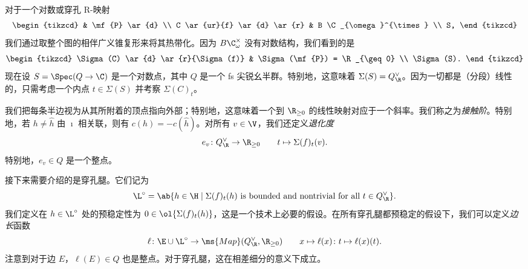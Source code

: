 \begin{exm}
\begin{center}
    \end{center}
\end{exm}

对于一个对数或穿孔 R-映射
\begin{equation*}
\begin{tikzcd}
    & \mf{P} \ar{d} \\
    C \ar{ur}{f} \ar{d} \ar{r} & B \C_{\omega}^{\times} \\
    S,
\end{tikzcd}
\end{equation*}
我们通过取整个图的相伴广义锥复形来将其热带化。因为 \(B \C_{\omega}^{\times}\) 没有对数结构，我们看到的是
\begin{equation*}
\begin{tikzcd}
    \Sigma(C) \ar{d} \ar{r}{\Sigma(f)} & \Sigma(\mf{P}) = \R_{\geq 0} \\
    \Sigma(S).
\end{tikzcd}
\end{equation*}
现在设 \(S = \Spec (Q \to \C)\) 是一个对数点，其中 \(Q\) 是一个 fs 尖锐幺半群。特别地，这意味着 \(\Sigma(S) = Q_{\R}^{\vee}\)。因为一切都是（分段）线性的，只需考虑一个内点 \(t \in \Sigma(S)\) 并考察 \(\Sigma(C)_t\)。

我们把每条半边视为从其所附着的顶点指向外部；特别地，这意味着一个到 \(\R_{\geq 0}\) 的线性映射对应于一个斜率。我们称之为\textit{接触阶}。特别地，若 \(h \neq \hat{h}\) 由 \(\imath\) 相关联，则有 \(c(h) = - c(\hat{h})\)。对所有 \(v \in \V\)，我们还定义\textit{退化度}
\[ e_v \colon Q_{\R}^{\vee} \to \R_{\geq 0} \qquad t \mapsto \Sigma(f)_t (v). \]
特别地，\(e_v \in Q\) 是一个整点。

接下来需要介绍的是穿孔腿。它们记为
\[ \L^{\circ} = \ab\{ h \in \H \mid \Sigma(f)_t(h) \text{ is bounded and nontrivial for all } t \in Q_{\R}^{\vee}\}. \] 
我们定义在 \(h \in \L^{\circ}\) 处的预稳定性为 \(0 \in \ol{\Sigma(f)_t(h)}\)，这是一个技术上必要的假设。在所有穿孔腿都预稳定的假设下，我们可以定义\textit{边长}函数
\[ \ell \colon \E \cup \L^{\circ} \to \ms{Map}(Q_{\R}^{\vee}, \R_{\geq 0}) \qquad x \mapsto \ell(x) \colon t \mapsto \ell(x)(t). \]
注意到对于边 \(E\)，\(\ell(E) \in Q\) 也是整点。对于穿孔腿，这在相差细分的意义下成立。

